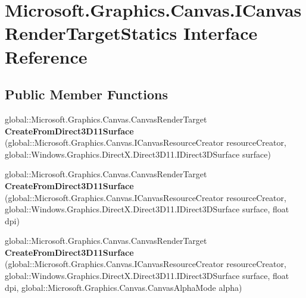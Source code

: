 \hypertarget{interface_microsoft_1_1_graphics_1_1_canvas_1_1_i_canvas_render_target_statics}{}\section{Microsoft.\+Graphics.\+Canvas.\+I\+Canvas\+Render\+Target\+Statics Interface Reference}
\label{interface_microsoft_1_1_graphics_1_1_canvas_1_1_i_canvas_render_target_statics}
\subsection*{Public Member Functions}
\begin{DoxyCompactItemize}
\item 
\mbox{\label{interface_microsoft_1_1_graphics_1_1_canvas_1_1_i_canvas_render_target_statics_a2d0a325b04d1c79f55549238fdde4934}} 
global\+::\+Microsoft.\+Graphics.\+Canvas.\+Canvas\+Render\+Target {\bfseries Create\+From\+Direct3\+D11\+Surface} (global\+::\+Microsoft.\+Graphics.\+Canvas.\+I\+Canvas\+Resource\+Creator resource\+Creator, global\+::\+Windows.\+Graphics.\+Direct\+X.\+Direct3\+D11.\+I\+Direct3\+D\+Surface surface)
\item 
\mbox{\label{interface_microsoft_1_1_graphics_1_1_canvas_1_1_i_canvas_render_target_statics_a4edef1637b0e569998765e88f846b084}} 
global\+::\+Microsoft.\+Graphics.\+Canvas.\+Canvas\+Render\+Target {\bfseries Create\+From\+Direct3\+D11\+Surface} (global\+::\+Microsoft.\+Graphics.\+Canvas.\+I\+Canvas\+Resource\+Creator resource\+Creator, global\+::\+Windows.\+Graphics.\+Direct\+X.\+Direct3\+D11.\+I\+Direct3\+D\+Surface surface, float dpi)
\item 
\mbox{\label{interface_microsoft_1_1_graphics_1_1_canvas_1_1_i_canvas_render_target_statics_a8416b671ded635e82d95a7581e4d8d67}} 
global\+::\+Microsoft.\+Graphics.\+Canvas.\+Canvas\+Render\+Target {\bfseries Create\+From\+Direct3\+D11\+Surface} (global\+::\+Microsoft.\+Graphics.\+Canvas.\+I\+Canvas\+Resource\+Creator resource\+Creator, global\+::\+Windows.\+Graphics.\+Direct\+X.\+Direct3\+D11.\+I\+Direct3\+D\+Surface surface, float dpi, global\+::\+Microsoft.\+Graphics.\+Canvas.\+Canvas\+Alpha\+Mode alpha)

\end{DoxyCompactItemize}
